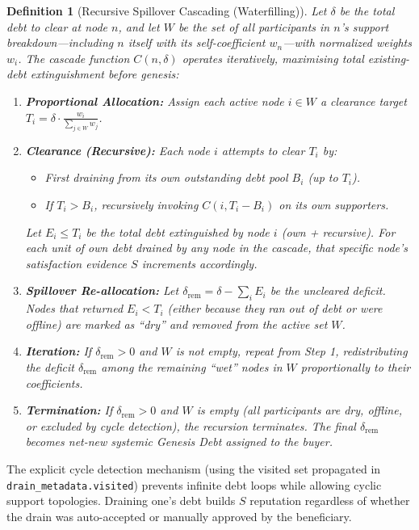 \documentclass[11pt]{article}
\newtheorem{definition}[theorem]{Definition}
\begin{document}
\begin{definition}[Recursive Spillover Cascading (Waterfilling)]\label{def:waterfilling}
Let $\delta$ be the total debt to clear at node $n$, and let $W$ be the set of all participants in $n$'s support breakdown---including $n$ itself with its self-coefficient $w_n$---with normalized weights $w_i$. The cascade function $C(n, \delta)$ operates iteratively, maximising total existing-debt extinguishment before genesis:

\begin{enumerate}
    \item \textbf{Proportional Allocation:} Assign each active node $i \in W$ a clearance target $T_i = \delta \cdot \frac{w_i}{\sum_{j \in W} w_j}$.
    \item \textbf{Clearance (Recursive):} Each node $i$ attempts to clear $T_i$ by:
    \begin{itemize}
        \item First draining from its own outstanding debt pool $B_i$ (up to $T_i$).
        \item If $T_i > B_i$, recursively invoking $C(i, T_i - B_i)$ on its own supporters.
    \end{itemize}
    Let $E_i \leq T_i$ be the total debt extinguished by node $i$ (own + recursive). For each unit of own debt drained by any node in the cascade, that specific node's satisfaction evidence $S$ increments accordingly.
    \item \textbf{Spillover Re-allocation:} Let $\delta_{\text{rem}} = \delta - \sum_i E_i$ be the uncleared deficit. Nodes that returned $E_i < T_i$ (either because they ran out of debt or were offline) are marked as ``dry'' and removed from the active set $W$.
    \item \textbf{Iteration:} If $\delta_{\text{rem}} > 0$ and $W$ is not empty, repeat from Step 1, redistributing the deficit $\delta_{\text{rem}}$ among the remaining ``wet'' nodes in $W$ proportionally to their coefficients.
    \item \textbf{Termination:} If $\delta_{\text{rem}} > 0$ and $W$ is empty (all participants are dry, offline, or excluded by cycle detection), the recursion terminates. The final $\delta_{\text{rem}}$ becomes net-new systemic Genesis Debt assigned to the buyer.
\end{enumerate}
\end{definition}

The explicit cycle detection mechanism (using the visited set propagated in \texttt{drain\_metadata.visited}) prevents infinite debt loops while allowing cyclic support topologies. Draining one's debt builds $S$ reputation regardless of whether the drain was auto-accepted or manually approved by the beneficiary.
\end{document}
